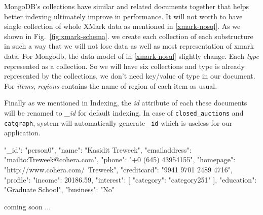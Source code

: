 
	MongoDB's collections have  similar and related documents together that helps better indexing ultimately improve in performance. It will not worth to have single collection of whole XMark data as mentioned in \ref{xmark-nosql}. As we shown in Fig.~\ref{fig:xmark-schema}. we create each collection of each substructure in such a way that we will not lose data as well as most representation of xmark data. For Mongodb, the data model of in \ref{xmark-nosql} slightly change. Each \textit{type} represented as a collection. So we will have six collections and type is already represented by the collections. we don't need key/value of type in our document. For \textit{items},  \textit{regions} contains the name of region of each item as usual. 
	
	Finally as we mentioned in Indexing, the \textit{id} attribute of each these documents will be renamed to \textit{\_id} for default indexing. In case of \texttt{closed\_auctions} and \texttt{catgraph}, system will automatically generate \texttt{\_id} which is useless for our application.
\label{code:mongodb-person0}
\begin{fakeJSON}[label=json123,caption=Mongodb data representation of XMARk data]
{
	"_id": "person0",
	"name": "Kasidit Treweek",
	"emailaddress": "mailto:Treweek@cohera.com",
	"phone": "+0 (645) 43954155",
	"homepage": "http://www.cohera.com/~Treweek",
	"creditcard": "9941 9701 2489 4716",
	"profile": {
		"income": 20186.59,
		"interest": [{
			"category": "category251"
		}],
		"education": "Graduate School",
		"business": "No"
	}
}
\end{fakeJSON} 
	
	coming soon ...
	
	
